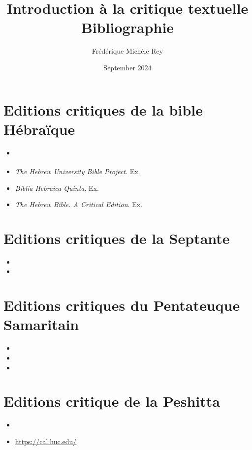 \documentclass[11pt,a4paper]{article}
\title{Introduction à la critique textuelle\\
Bibliographie}
\author{Frédérique Michèle Rey}
\date{September 2024}
\begin{document}
\maketitle
\justifying

\section{Editions critiques de la bible Hébraïque}
\begin{itemize}
    \item \cite{elliger_biblia_2007}
    \item \textit{The Hebrew University Bible Project}. Ex. 
    \item \textit{Biblia Hebraica Quinta}. Ex. 
    \item \textit{The Hebrew Bible. A Critical Edition}. Ex. 
    
\end{itemize}
\section{Editions critiques de la Septante}
\begin{itemize}
    \item {}
    \item {}
\end{itemize}
\section{Editions critiques du Pentateuque Samaritain}
    \begin{itemize}
        \item {}
        \item {}
        \item {}
    \end{itemize}
\section{Editions critique de la Peshitta}
    \begin{itemize}
        \item {}
        \item \href{https://cal.huc.edu/}{https://cal.huc.edu/}
    \end{itemize}
\end{document}
